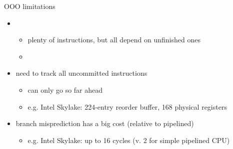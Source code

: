\begin{frame}{OOO limitations}
    \begin{itemize}
        \item {}
            \begin{itemize}
            \item plenty of instructions, but all depend on unfinished ones
            \item {}
            \end{itemize}
        \item need to track all uncommitted instructions
            \begin{itemize}
            \item can only go so far ahead
            \item e.g. Intel Skylake: 224-entry reorder buffer, 168 physical registers
            \end{itemize}
        \item branch misprediction has a big cost (relative to pipelined)
            \begin{itemize}
            \item e.g. Intel Skylake: up to 16 cycles (v. 2 for simple pipelined CPU)
            \end{itemize}
    \end{itemize}
\end{frame}
